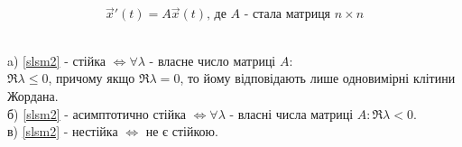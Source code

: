 \documentclass[14pt,a4paper]{scrartcl}
\theoremstyle{definition}
\theoremstyle{definition}
\theoremstyle{definition}
\begin{document}
\begin{equation}\label{slsm2}
\overrightarrow{x} ' (t) = A \overrightarrow{x} (t) \text{, де $A$ - стала матриця $n \times n$}
\end{equation}
\begin{boxteo} \quad \\
a) \eqref{slsm2} - стійка $ \Longleftrightarrow  \forall \lambda $ - власне число матриці $A$: \\
$\Re \lambda \leq 0$, причому якщо $ \Re \lambda = 0$, то йому відповідають лише одновимірні клітини Жордана. \\
б) \eqref{slsm2} - асимптотично стійка $ \Longleftrightarrow \forall \lambda $ - власні числа матриці $A: \Re \lambda < 0 $.\\
в) \eqref{slsm2} - нестійка $ \Longleftrightarrow $ не є стійкою.
\end{boxteo}
\end{document}
